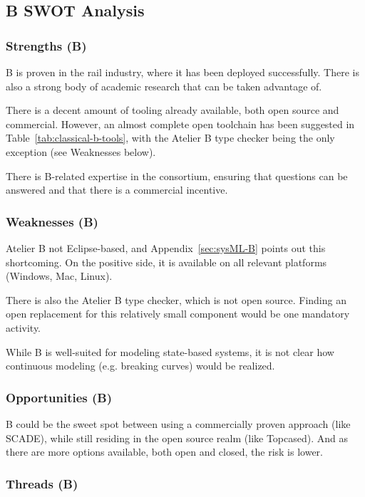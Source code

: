 \subsection{B SWOT Analysis}

\subsubsection{Strengths (B)}

B is proven in the rail industry, where it has been deployed successfully.  There is also a strong body of academic research that can be taken advantage of.

There is a decent amount of tooling already available, both open source and commercial.  However, an almost complete open toolchain has been suggested in Table~\ref{tab:classical-b-tools}, with the Atelier B type checker being the only exception (see Weaknesses below).

There is B-related expertise in the consortium, ensuring that questions can be answered and that there is a commercial incentive.

\subsubsection{Weaknesses (B)}

Atelier B not Eclipse-based, and Appendix~\ref{sec:sysML-B} points out this shortcoming.  On the positive side, it is available on all relevant platforms (Windows, Mac, Linux).

There is also the Atelier B type checker, which is not open source.  Finding an open replacement for this relatively small component would be one mandatory activity.

While B is well-suited for modeling state-based systems, it is not clear how continuous modeling (e.g. breaking curves) would be realized.


\subsubsection{Opportunities (B)}

B could be the sweet spot between using a commercially proven approach (like SCADE), while still residing in the open source realm (like Topcased).  And as there are more options available, both open and closed, the risk is lower.

\subsubsection{Threads (B)}

